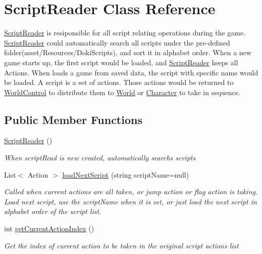 \hypertarget{class_script_reader}{}\section{Script\+Reader Class Reference}
\label{class_script_reader}


\hyperlink{class_script_reader}{Script\+Reader} is resiponsible for all script relating operations during the game. \hyperlink{class_script_reader}{Script\+Reader} could automatically search all scripts under the pre-\/defined folder(asset/\+Resources/\+Doki\+Scripts), and sort it in alphabet order. When a new game starts up, the first script would be loaded, and \hyperlink{class_script_reader}{Script\+Reader} keeps all Actions. When loads a game from saved data, the script with specific name would be loaded. A script is a set of actions. Those actions would be returned to \hyperlink{class_world_control}{World\+Control} to distribute them to \hyperlink{class_world}{World} or \hyperlink{class_character}{Character} to take in sequence.  


\subsection*{Public Member Functions}
\begin{DoxyCompactItemize}
\item 
\hyperlink{class_script_reader_a2c82ee783650e92155ce7c967dd3ec35}{Script\+Reader} ()
\begin{DoxyCompactList}\small\item\em When script\+Read is new created, automatically searchs scripts \end{DoxyCompactList}\item 
List$<$ Action $>$ \hyperlink{class_script_reader_a2703b42aeba068c816b799e18643e329}{load\+Next\+Script} (string script\+Name=null)
\begin{DoxyCompactList}\small\item\em Called when current actions are all taken, or jump action or flag action is taking. Load next script, use the script\+Name when it is set, or just load the next script in alphabet order of the script list. \end{DoxyCompactList}\item 
int \hyperlink{class_script_reader_a090a3839aa5da85a65bcd548a2c2e23f}{get\+Current\+Action\+Index} ()
\begin{DoxyCompactList}\small\item\em Get the index of current action to be taken in the original script actions\textquotesingle{} list \end{DoxyCompactList}\end{DoxyCompactItemize}
